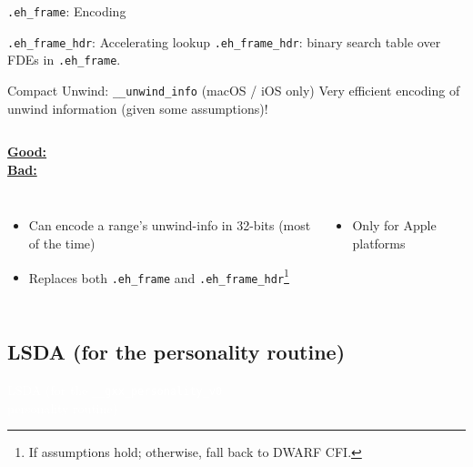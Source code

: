 \begin{frame}{\texttt{.eh\_frame}: Encoding}
  \vfill
  \vfill
\end{frame}

\begin{frame}{\texttt{.eh\_frame\_hdr}: Accelerating lookup}
  \texttt{.eh\_frame\_hdr}: binary search table over FDEs in \texttt{.eh\_frame}.
  \vfill
  \begin{center}
    \resizebox{\textwidth}{!}{}
  \end{center}
\end{frame}

\begin{frame}{Compact Unwind: \texttt{\_\_unwind\_info} (macOS / iOS only)}
  \alert{Very efficient} encoding of unwind information (given some assumptions)!
  \vfill
  \begin{columns}
    \underline{\bfseries Good:}\\

    \underline{\bfseries Bad:}\\
  \end{columns}
  \begin{columns}
    \begin{itemize}
    \item Can encode a range's unwind-info in 32-bits (most of the time)
    \item Replaces both \texttt{.eh\_frame} and \texttt{.eh\_frame\_hdr}\footnote{If assumptions hold; otherwise, fall back to DWARF CFI.}
    \end{itemize}

    \begin{itemize}
    \item Only for Apple platforms
    \end{itemize}
  \end{columns}
\end{frame}

\subsection{LSDA (for the personality routine)}
           {
             \begin{frame}
               \centering
               \vfill\textcolor{white}{\Large LSDA (for the \texttt{\_\_gxx\_personality\_v0}\\personality routine)}\vfill
             \end{frame}
           }

